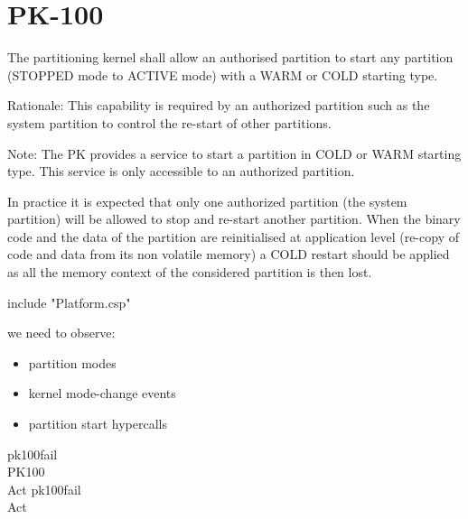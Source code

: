 \section{PK-100} %

The partitioning kernel shall allow an authorised partition
to start any partition (STOPPED mode to ACTIVE mode)
with a WARM or COLD starting type.

Rationale: This capability is required by an authorized partition such as the
system partition to control the re-start of other partitions.

Note: The PK provides a service to start a partition in COLD or WARM starting
type. This service is only accessible to an authorized partition.

In practice it is expected that only one authorized partition (the system
partition) will be allowed to stop and re-start another partition. When the
binary code and the data of the partition are reinitialised at application
level (re-copy of code and data from its non volatile memory) a COLD restart
should be applied as all the memory context of the considered partition is
then lost.

\begin{assert}
include "Platform.csp"
\end{assert}
 we need to observe:
 \begin{itemize}
 \item partition modes
 \item kernel mode-change events
 \item partition start hypercalls
\end{itemize}
\begin{circus}
\circchannel pk100fail\\

\circprocess PK100 \circdef \circbegin\\
  Act \circdef pk100fail \then \Stop\\ %
  \circspot Act\\
\circend
\end{circus}
